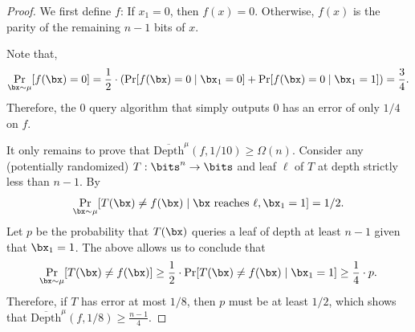 \documentclass[11pt]{article}
\DeclarePairedDelimiter\paren{(}{)}
\begin{document}
\begin{proof}
    We first define $f$: If $x_1 = 0$, then $f(x) = 0$. Otherwise, $f(x)$ is the parity of the remaining $n-1$ bits of $x$.

    Note that,
    \begin{equation*}
        \Pr_{\bx \sim \mu}[f(\bx) = 0] = \frac{1}{2} \cdot \paren*{\Pr[f(\bx) = 0 \mid \bx_1 = 0] + \Pr[f(\bx) = 0 \mid \bx_1 = 1]} = \frac{3}{4}.
    \end{equation*}
    Therefore, the $0$ query algorithm that simply outputs $0$ has an error of only $1/4$ on $f$. 
    
    It only remains to prove that $\overline{\mathrm{Depth}}^{\mu}(f,1/10) \geq \Omega(n)$. Consider any (potentially randomized) $T:\bits^n \to \bits$ and leaf $\ell$ of $T$ at depth strictly less than $n-1$. By 
    \begin{equation*}
        \Pr_{\bx \sim \mu}[T(\bx) \neq f(\bx) \mid \bx \text{ reaches } \ell, \bx_1 = 1] = 1/2.
    \end{equation*}
    Let $p$ be the probability that $T(\bx)$ queries a leaf of depth at least $n-1$ given that $\bx_1 = 1$. The above allows us to conclude that
    \begin{equation*}
        \Pr_{\bx \sim \mu}[T(\bx) \neq f(\bx)] \geq \frac{1}{2} \cdot \Pr[T(\bx) \neq f(\bx)\mid \bx_1 = 1] \geq \frac{1}{4} \cdot p. 
    \end{equation*}
    Therefore, if $T$ has error at most $1/8$, then $p$ must be at least $1/2$, which shows that $\overline{\mathrm{Depth}}^{\mu}(f,1/8) \geq \frac{n-1}{4}$.
\end{proof}
\end{document}

